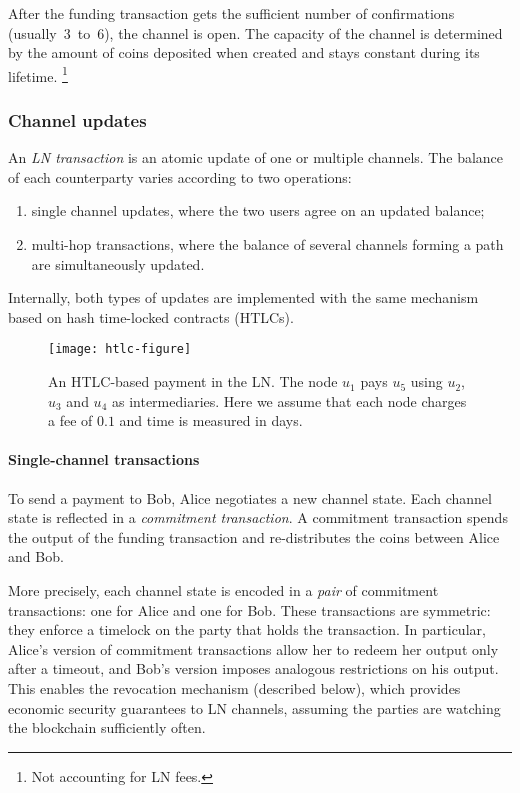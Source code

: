 After the funding transaction gets the sufficient number of confirmations (usually~$3$~to~$6$), the channel is open.
The capacity of the channel is determined by the amount of coins deposited when created and stays constant during its lifetime.
\footnote{Not accounting for LN fees.}

\subsubsection*{Channel updates}

An \textit{LN transaction} is an atomic update of one or multiple channels.
The balance of each counterparty varies according to two operations:
\begin{enumerate}
	\item single channel updates, where the two users agree on an updated balance;
	\item multi-hop transactions, where the balance of several channels forming a path are simultaneously updated.
\end{enumerate}

Internally, both types of updates are implemented with the same mechanism based on hash time-locked contracts (HTLCs).

\begin{figure*}[tb]
	\texttt{[image: htlc-figure]}
	\caption{An HTLC-based payment in the LN. The node $u_1$ pays $u_5$ using $u_2$, $u_3$ and $u_4$ as intermediaries. 
		Here we assume that each node charges a fee of $0.1$ and time is measured in days.\label{fig:htlc}}
\end{figure*}

\paragraph{Single-channel transactions}

To send a payment to Bob, Alice negotiates a new channel state.
Each channel state is reflected in a \textit{commitment transaction}.
A commitment transaction spends the output of the funding transaction and re-distributes the coins between Alice and Bob.

More precisely, each channel state is encoded in a \textit{pair} of commitment transactions: one for Alice and one for Bob.
These transactions are symmetric: they enforce a timelock on the party that holds the transaction.
In particular, Alice's version of commitment transactions allow her to redeem her output only after a timeout, and Bob's version imposes analogous restrictions on his output.
This enables the revocation mechanism (described below), which provides economic security guarantees to LN channels, assuming the parties are watching the blockchain sufficiently often.

